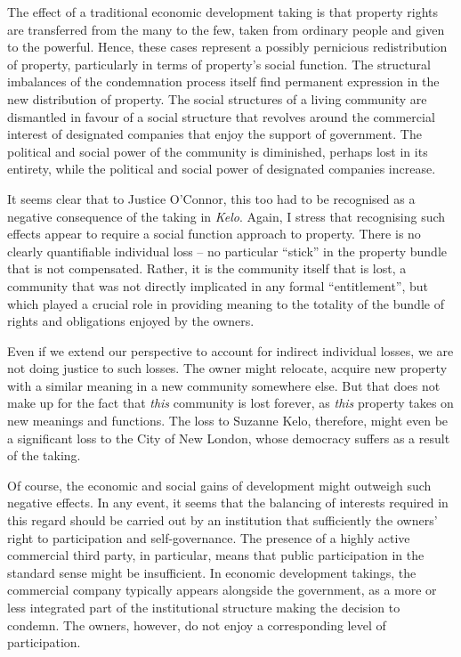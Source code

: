 The effect of a traditional economic development taking is that property rights are transferred from the many to the few, taken from ordinary people and given to the powerful. Hence, these cases represent a possibly pernicious redistribution of property, particularly in terms of property's social function. The structural imbalances of the condemnation process itself find permanent expression in the new distribution of property. The social structures of a living community are dismantled in favour of a social structure that revolves around the commercial interest of designated companies that enjoy the support of government. The political and social power of the community is diminished, perhaps lost in its entirety, while the political and social power of designated companies increase.

It seems clear that to Justice O'Connor, this too had to be recognised as a negative consequence of the taking in {\it Kelo}. Again, I stress that recognising such effects appear to require a social function approach to property. There is no clearly quantifiable individual loss -- no  particular ``stick'' in the property bundle that is not compensated. Rather, it is the community itself that is lost, a community that was not directly implicated in any formal ``entitlement'', but which played a crucial role in providing meaning to the totality of the bundle of rights and obligations enjoyed by the owners. 

Even if we extend our perspective to account for indirect individual losses, we are not doing justice to such losses. The owner might relocate, acquire new property with a similar meaning in a new community somewhere else. But that does not make up for the fact that {\it this} community is lost forever, as {\it this} property takes on new meanings and functions. The loss to Suzanne Kelo, therefore, might even be a significant loss to the City of New London, whose democracy suffers as a result of the taking.

Of course, the economic and social gains of development might outweigh such negative effects. In any event, it seems that the balancing of interests required in this regard should be carried out by an institution that sufficiently  the owners' right to participation and self-governance. The presence of a highly active commercial third party, in particular, means that public participation in the standard sense might be insufficient. In economic development takings, the commercial company typically appears alongside the government, as a more or less integrated part of the institutional structure making the decision to condemn. The owners, however, do not enjoy a corresponding level of participation.

